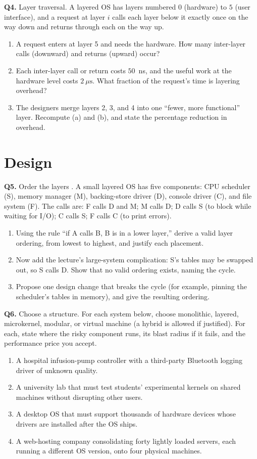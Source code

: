 \documentclass[11pt]{article}
\begin{document}
\textbf{Q4.} Layer traversal. A layered OS has layers numbered $0$ (hardware) to $5$ (user interface), and a request at layer $i$ calls each layer below it exactly once on the way down and returns through each on the way up.
\begin{enumerate}
  \item[(a)] A request enters at layer 5 and needs the hardware. How many inter-layer calls (downward) and returns (upward) occur?
  \item[(b)] Each inter-layer call or return costs $50$~ns, and the useful work at the hardware level costs $2~\mu\text{s}$. What fraction of the request's time is layering overhead?
  \item[(c)] The designers merge layers 2, 3, and 4 into one ``fewer, more functional'' layer. Recompute (a) and (b), and state the percentage reduction in overhead.
\end{enumerate}

\section{Design}

\textbf{Q5.} Order the layers \cite{SilberschatzOSC_operating_system_concepts}. A small layered OS has five components: CPU scheduler (S), memory manager (M), backing-store driver (D), console driver (C), and file system (F). The calls are: F calls D and M; M calls D; D calls S (to block while waiting for I/O); C calls S; F calls C (to print errors).
\begin{enumerate}
  \item[(a)] Using the rule ``if A calls B, B is in a lower layer,'' derive a valid layer ordering, from lowest to highest, and justify each placement.
  \item[(b)] Now add the lecture's large-system complication: S's tables may be swapped out, so S calls D. Show that no valid ordering exists, naming the cycle.
  \item[(c)] Propose one design change that breaks the cycle (for example, pinning the scheduler's tables in memory), and give the resulting ordering.
\end{enumerate}

\textbf{Q6.} Choose a structure. For each system below, choose monolithic, layered, microkernel, modular, or virtual machine (a hybrid is allowed if justified). For each, state where the risky component runs, its blast radius if it fails, and the performance price you accept.
\begin{enumerate}
  \item[(a)] A hospital infusion-pump controller with a third-party Bluetooth logging driver of unknown quality.
  \item[(b)] A university lab that must test students' experimental kernels on shared machines without disrupting other users.
  \item[(c)] A desktop OS that must support thousands of hardware devices whose drivers are installed after the OS ships.
  \item[(d)] A web-hosting company consolidating forty lightly loaded servers, each running a different OS version, onto four physical machines.
\end{enumerate}



\end{document}

